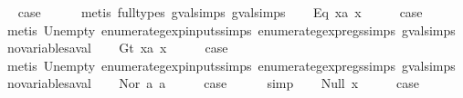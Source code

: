 \begin{isabellebody}
\ \isamarkupfalse%
\ {\isacharquery}case\isanewline
\ \ \ \ \isamarkupfalse%
\ {\isacharparenleft}metis\ {\isacharparenleft}full{\isacharunderscore}types{\isacharparenright}\ gval{\isachardot}simps{\isacharparenleft}{}{\isacharparenright}\ gval{\isachardot}simps{\isacharparenleft}{}{\isacharparenright}{\isacharparenright}\isanewline
{}\isamarkupfalse%
\isanewline
\ \ \isamarkupfalse%
\ {\isacharparenleft}Eq\ x{}a\ x{}{\isacharparenright}\isanewline
\ \ \isamarkupfalse%
\ \isamarkupfalse%
\ {\isacharquery}case\isanewline
\ \ \ \ \isamarkupfalse%
\ {\isacharparenleft}metis\ Un{\isacharunderscore}empty\ enumerate{\isacharunderscore}gexp{\isacharunderscore}inputs{\isachardot}simps{\isacharparenleft}{}{\isacharparenright}\ enumerate{\isacharunderscore}gexp{\isacharunderscore}regs{\isachardot}simps{\isacharparenleft}{}{\isacharparenright}\ gval{\isachardot}simps{\isacharparenleft}{}{\isacharparenright}\ no{\isacharunderscore}variables{\isacharunderscore}aval{\isacharparenright}\isanewline
{}\isamarkupfalse%
\isanewline
\ \ \isamarkupfalse%
\ {\isacharparenleft}Gt\ x{}a\ x{}{\isacharparenright}\isanewline
\ \ \isamarkupfalse%
\ \isamarkupfalse%
\ {\isacharquery}case\isanewline
\ \ \ \ \isamarkupfalse%
\ {\isacharparenleft}metis\ Un{\isacharunderscore}empty\ enumerate{\isacharunderscore}gexp{\isacharunderscore}inputs{\isachardot}simps{\isacharparenleft}{}{\isacharparenright}\ enumerate{\isacharunderscore}gexp{\isacharunderscore}regs{\isachardot}simps{\isacharparenleft}{}{\isacharparenright}\ gval{\isachardot}simps{\isacharparenleft}{}{\isacharparenright}\ no{\isacharunderscore}variables{\isacharunderscore}aval{\isacharparenright}\isanewline
{}\isamarkupfalse%
\isanewline
\ \ \isamarkupfalse%
\ {\isacharparenleft}Nor\ a{}\ a{}{\isacharparenright}\isanewline
\ \ \isamarkupfalse%
\ \isamarkupfalse%
\ {\isacharquery}case\isanewline
\ \ \ \ \isamarkupfalse%
\ simp\isanewline
{}\isamarkupfalse%
\isanewline
\ \ \isamarkupfalse%
\ {\isacharparenleft}Null\ x{\isacharparenright}\isanewline
\ \ \isamarkupfalse%
\ \isamarkupfalse%
\ {\isacharquery}case\isanewline
\ \ \ \ \isamarkupfalse%

\end{isabellebody}
